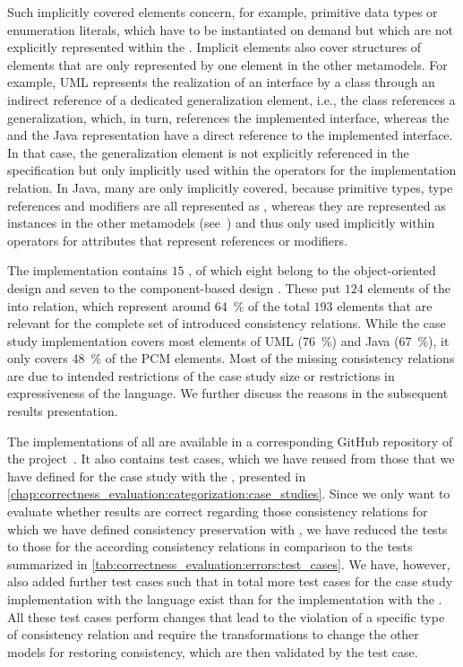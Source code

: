 Such implicitly covered elements concern, for example, primitive data types or enumeration literals, which have to be instantiated on demand but which are not explicitly represented within the \commonalities.
Implicit elements also cover structures of elements that are only represented by one element in the other metamodels.
For example, \gls{UML} represents the realization of an interface by a class through an indirect reference of a dedicated generalization element, i.e., the class references a generalization, which, in turn, references the implemented interface, whereas the \commonality and the Java representation have a direct reference to the implemented interface.
In that case, the generalization element is not explicitly referenced in the \commonality specification but only implicitly used within the operators for the implementation relation.
In Java, many \metaclasses are only implicitly covered, because primitive types, type references and modifiers are all represented as \metaclasses, whereas they are represented as instances in the other metamodels (see~) and thus only used implicitly within operators for attributes that represent references or modifiers.

The implementation contains $15$ \commonalities, of which eight belong to the object-oriented design and seven to the component-based design \conceptmetamodel.
These \commonalities put $124$ elements of the \concretemetamodels into relation, which represent around \SI{64}{\percent} of the total $193$ elements that are relevant for the complete set of introduced consistency relations.
While the case study implementation covers most elements of \gls{UML} (\SI{76}{\percent}) and Java (\SI{67}{\percent}), it only covers \SI{48}{\percent} of the \gls{PCM} elements.
Most of the missing consistency relations are due to intended restrictions of the case study size or restrictions in expressiveness of the \commonalities language.
We further discuss the reasons in the subsequent results presentation.

The implementations of all \commonalities are available in a corresponding GitHub repository of the \vitruv project~.
It also contains test cases, which we have reused from those that we have defined for the case study with the \reactionslanguage, presented in \autoref{chap:correctness_evaluation:categorization:case_studies}.
Since we only want to evaluate whether results are correct regarding those consistency relations for which we have defined consistency preservation with \commonalities, we have reduced the tests to those for the according consistency relations in comparison to the tests summarized in \autoref{tab:correctness_evaluation:errors:test_cases}.
We have, however, also added further test cases such that in total more test cases for the case study implementation with the \commonalities language exist than for the implementation with the \reactionslanguage.
All these test cases perform changes that lead to the violation of a specific type of consistency relation and require the transformations to change the other models for restoring consistency, which are then validated by the test case.

